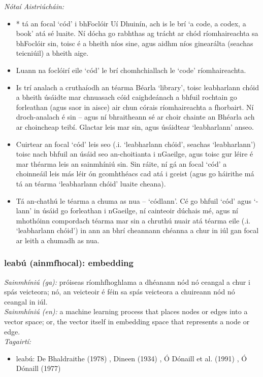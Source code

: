  \noindent \textit{Nótaí Aistriúcháin:}
\begin{itemize}
	\item * tá an focal `cód' i bhFoclóir Uí Dhuinín, ach is le brí `a code, a codex, a book' atá sé luaite. Ní dócha go rabhthas ag trácht ar chód ríomhaireachta sa bhFoclóir sin, toisc é a bheith níos sine, agus aidhm níos ginearálta (seachas teicniúil) a bheith aige.
	\item Luann na foclóirí eile `cód' le brí chomhchiallach le `code' ríomhaireachta.
	\item Is trí analach a cruthaíodh an téarma Béarla `library', toisc leabharlann chóid a bheith úsáidte mar chnuasach cóid caighdeánach a bhfuil rochtain go forleathan (agus saor in aisce) air chun córais ríomhaireachta a fhorbairt. Ní droch-analach é sin -- agus ní bhraitheann sé ar choir chainte an Bhéarla ach ar choincheap teibí. Glactar leis mar sin, agus úsáidtear `leabharlann' anseo.
	\item Cuirtear an focal `cód' leis seo (.i. `leabharlann chóid', seachas `leabharlann') toisc nach bhfuil an úsáid seo an-choitianta i nGaeilge, agus toisc gur léire é mar théarma leis an sainmhíniú sin. Sin ráite, ní gá an focal `cód' a choinneáil leis más léir ón gcomhthéacs cad atá i gceist (agus go háirithe má tá an téarma `leabharlann chóid' luaite cheana).
	\item Tá an-chathú le téarma a chuma as nua -- `códlann'. Cé go bhfuil `cód' agus `-lann' in úsáid go forleathan i nGaeilge, ní cainteoir dúchais mé, agus ní mhothóinn compordach téarma mar sin a chruthú nuair atá téarma eile (.i. `leabharlann chóid') in ann an bhrí cheannann chéanna a chur in iúl gan focal ar leith a chumadh as nua.
\end{itemize}


\subsubsection*{leabú (ainmfhocal): embedding}
 \noindent \textit{Sainmhíniú (ga):} próiseas ríomhfhoghlama a dhéanann nód nó ceangal a chur i spás veicteora; nó, an veicteoir é féin sa spás veicteora a chuireann nód nó ceangal in iúl.
\\
 \noindent \textit{Sainmhíniú (en):} a machine learning process that places nodes or edges into a vector space; or, the vector itself in embedding space that represents a node or edge.
\\
 \noindent \textit{Tagairtí:}
\begin{itemize}
	\item leabú: De Bhaldraithe (1978) \cite{de-bhaldraithe}, Dineen (1934) \cite{dineen}, Ó Dónaill et al. (1991) \cite{focloir-beag}, Ó Dónaill (1977) \cite{odonaill}
\end{itemize}

